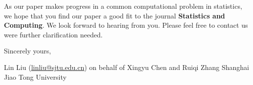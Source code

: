 \documentclass[11pt]{article}
\begin{document}
As our paper makes progress in a common computational problem in statistics, we hope that you find our paper a good fit to the journal \textbf{Statistics and Computing}. We look forward to hearing from you. Please feel free to contact us were further clarification needed.

\bigskip %

Sincerely yours,

Lin Liu (\href{linliu@sjtu.edu.cn}{linliu@sjtu.edu.cn}) on behalf of Xingyu Chen and Ruiqi Zhang \newline
Shanghai Jiao Tong University


\end{document}

